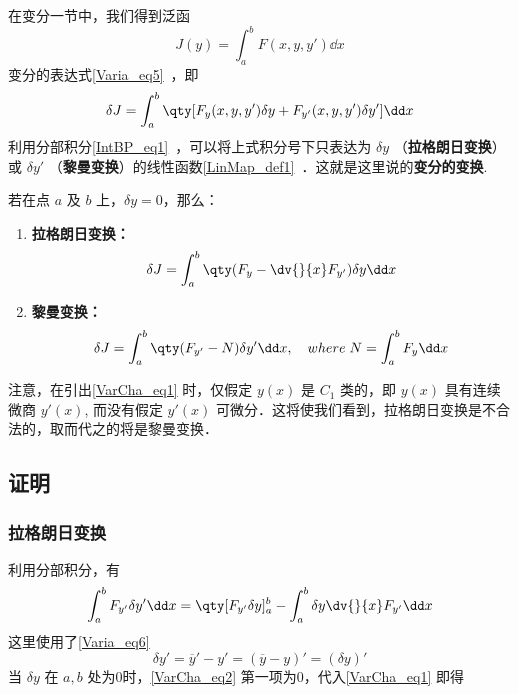 
在变分一节中，我们得到泛函 
\begin{equation}
J(y)=\int_a^bF(x,y,y')\dd x
\end{equation}
变分的表达式\autoref{Varia_eq5}~，即
\begin{equation}\label{VarCha_eq1}
\delta J=\int_a^b\qty[F_y(x,y,y')\delta y+F_{y'}(x,y,y')\delta y']\dd x
\end{equation}
利用分部积分\autoref{IntBP_eq1}~，可以将上式积分号下只表达为 $\delta y$ （\textbf{拉格朗日变换}）或 $\delta y'$ （\textbf{黎曼变换}）的线性函数\autoref{LinMap_def1}~．这就是这里说的\textbf{变分的变换}.

若在点 $a$ 及 $b$ 上，$\delta y=0$，那么：
\begin{enumerate}
\item \textbf{拉格朗日变换：}
\begin{equation}\label{VarCha_eq3}
\delta J=\int_a^b\qty(F_y-\dv{}{x}F_{y'})\delta y\dd x
\end{equation}
\item \textbf{黎曼变换：}
\begin{equation}
\delta J=\int_a^b\qty(F_{y'}-N)\delta y'\dd x ,\quad where \;N=\int_a^bF_y\dd x
\end{equation}
\end{enumerate}


注意，在引出\autoref{VarCha_eq1} 时，仅假定 $y(x)$ 是 $C_1$ 类的，即 $y(x)$ 具有连续微商 $y'(x)$, 而没有假定 $y'(x)$ 可微分．这将使我们看到，拉格朗日变换是不合法的，取而代之的将是黎曼变换． 

\subsection{证明}
\subsubsection{拉格朗日变换}
利用分部积分，有
\begin{equation}\label{VarCha_eq2}
\int_a^bF_{y'}\delta y'\dd x=\qty[F_{y'}\delta y]_a^b-\int_a^b\delta y\dv{}{x}F_{y'}\dd x
\end{equation}
这里使用了\autoref{Varia_eq6}~
\begin{equation}
\delta y'=\overline{y}'-y'=(\overline{y}-y)'=(\delta y)'
\end{equation}
当 $\delta y$ 在 $a,b$ 处为0时，\autoref{VarCha_eq2} 第一项为0，代入\autoref{VarCha_eq1} 即得